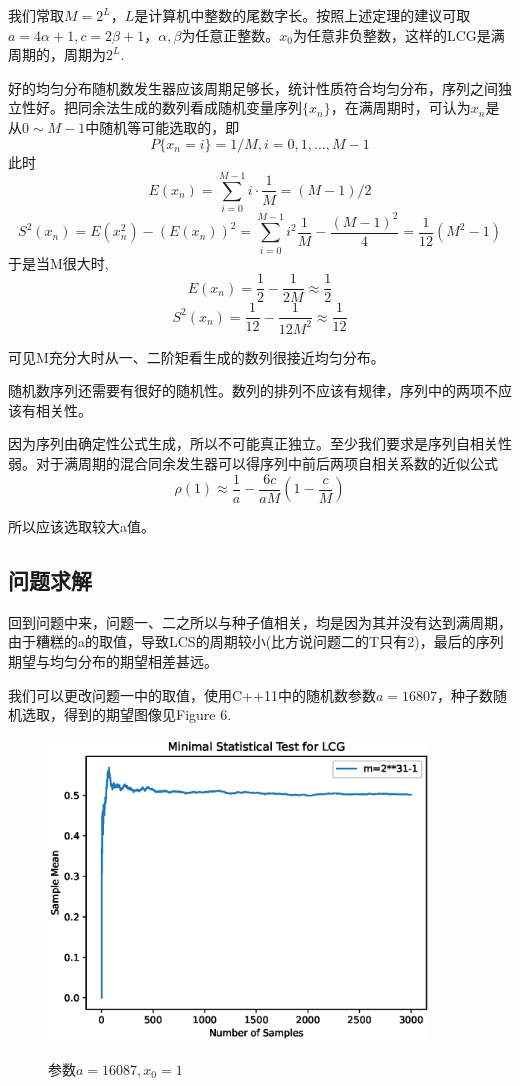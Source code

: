 \documentclass[12pt,a4paper]{article}%
\begin{document}
    我们常取$M=2^L$，$L$是计算机中整数的尾数字长。按照上述定理的建议可取$a=4\alpha+1,c=2\beta+1$，$\alpha,\beta$为任意正整数。$x_0$为任意非负整数，这样的LCG是满周期的，周期为$2^L$.

    好的均匀分布随机数发生器应该周期足够长，统计性质符合均匀分布，序列之间独立性好。把同余法生成的数列看成随机变量序列$\{x_n\}$，在满周期时，可认为$x_n$是从$0\sim M-1$中随机等可能选取的，即
    \[P\{x_n=i\}=1/M,i=0,1,\ldots,M-1\]
    此时
    \[E\left( x_n \right)=\sum_{i=0}^{M-1}i\cdot\frac{1}{M}=(M-1)/2\]
    \[S^2 \left( x_n \right)=E\left( x_n^2 \right)-\left( E\left( x_n \right) \right)^2 =\sum^{M-1}_{i=0}i^2\frac{1}{M}-\frac{\left( M-1 \right)^2}{4}=\frac{1}{12}\left( M^2-1 \right)\]
    于是当M很大时,
    \[E\left( x_n \right)=\frac{1}{2}-\frac{1}{2M}\approx \frac{1}{2}\]
    \[S^2 \left( x_n \right)=\frac{1}{12}-\frac{1}{12M^2}\approx\frac{1}{12}\]

    可见M充分大时从一、二阶矩看生成的数列很接近均匀分布。

    随机数序列还需要有很好的随机性。数列的排列不应该有规律，序列中的两项不应该有相关性。


    因为序列由确定性公式生成，所以不可能真正独立。至少我们要求是序列自相关性弱。对于满周期的混合同余发生器可以得序列中前后两项自相关系数的近似公式
    \[\rho\left( 1 \right)\approx \frac{1}{a}-\frac{6c}{aM}\left( 1-\frac{c}{M} \right)\]

    所以应该选取较大a值。

    \subsection{问题求解}
    回到问题中来，问题一、二之所以与种子值相关，均是因为其并没有达到满周期，由于糟糕的a的取值，导致LCS的周期较小(比方说问题二的T只有2)，最后的序列期望与均匀分布的期望相差甚远。

    我们可以更改问题一中的取值，使用C++11中的随机数参数$a=16807$，种子数随机选取，得到的期望图像见Figure 6.
    \begin{figure}[htbp]
        \centering
        \includegraphics[height=8cm]{Problem_3}\label{fig:figure4}
        \caption{参数$a=16087,x_0=1$}
    \end{figure}
\end{document}
